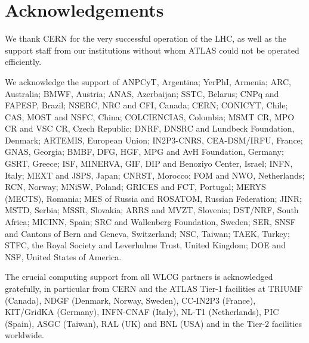 \documentclass[11pt,a4paper,dvips]{article}
\begin{document}
\section{Acknowledgements}

We thank CERN for the very successful operation of the LHC, as well as the
support staff from our institutions without whom ATLAS could not be
operated efficiently.

We acknowledge the support of ANPCyT, Argentina; YerPhI, Armenia; ARC,
Australia; BMWF, Austria; ANAS, Azerbaijan; SSTC, Belarus; CNPq and FAPESP,
Brazil; NSERC, NRC and CFI, Canada; CERN; CONICYT, Chile; CAS, MOST and
NSFC, China; COLCIENCIAS, Colombia; MSMT CR, MPO CR and VSC CR, Czech
Republic; DNRF, DNSRC and Lundbeck Foundation, Denmark; ARTEMIS, European
Union; IN2P3-CNRS, CEA-DSM/IRFU, France; GNAS, Georgia; BMBF, DFG, HGF, MPG
and AvH Foundation, Germany; GSRT, Greece; ISF, MINERVA, GIF, DIP and
Benoziyo Center, Israel; INFN, Italy; MEXT and JSPS, Japan; CNRST, Morocco;
FOM and NWO, Netherlands; RCN, Norway; MNiSW, Poland; GRICES and FCT,
Portugal; MERYS (MECTS), Romania; MES of Russia and ROSATOM, Russian
Federation; JINR; MSTD, Serbia; MSSR, Slovakia; ARRS and MVZT, Slovenia;
DST/NRF, South Africa; MICINN, Spain; SRC and Wallenberg Foundation,
Sweden; SER, SNSF and Cantons of Bern and Geneva, Switzerland; NSC, Taiwan;
TAEK, Turkey; STFC, the Royal Society and Leverhulme Trust, United Kingdom;
DOE and NSF, United States of America.

The crucial computing support from all WLCG partners is acknowledged
gratefully, in particular from CERN and the ATLAS Tier-1 facilities at
TRIUMF (Canada), NDGF (Denmark, Norway, Sweden), CC-IN2P3 (France),
KIT/GridKA (Germany), INFN-CNAF (Italy), NL-T1 (Netherlands), PIC (Spain),
ASGC (Taiwan), RAL (UK) and BNL (USA) and in the Tier-2 facilities
worldwide.
\end{document}

